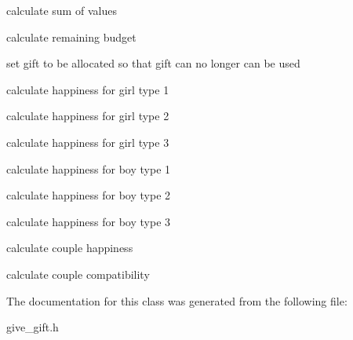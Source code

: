 calculate sum of values

calculate remaining budget

set gift to be allocated so that gift can no longer can be used

calculate happiness for girl type 1

calculate happiness for girl type 2

calculate happiness for girl type 3

calculate happiness for boy type 1

calculate happiness for boy type 2

calculate happiness for boy type 3

calculate couple happiness

calculate couple compatibility 

The documentation for this class was generated from the following file\+:\begin{DoxyCompactItemize}
\item 
give\+\_\+gift.\+h\end{DoxyCompactItemize}

